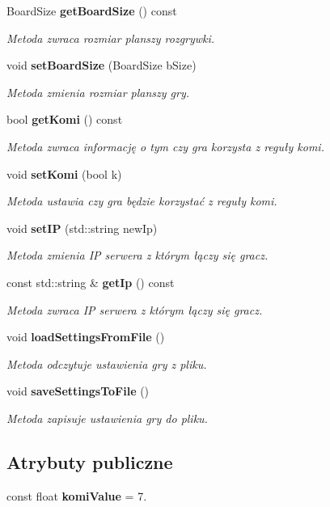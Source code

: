 \begin{DoxyCompactItemize}
Board\+Size \textbf{ get\+Board\+Size} () const
\begin{DoxyCompactList}\small\item\em Metoda zwraca rozmiar planszy rozgrywki. \end{DoxyCompactList}\item 
void \textbf{ set\+Board\+Size} (Board\+Size b\+Size)
\begin{DoxyCompactList}\small\item\em Metoda zmienia rozmiar planszy gry. \end{DoxyCompactList}\item 
bool \textbf{ get\+Komi} () const
\begin{DoxyCompactList}\small\item\em Metoda zwraca informację o tym czy gra korzysta z reguły komi. \end{DoxyCompactList}\item 
void \textbf{ set\+Komi} (bool k)
\begin{DoxyCompactList}\small\item\em Metoda ustawia czy gra będzie korzystać z reguły komi. \end{DoxyCompactList}\item 
void \textbf{ set\+IP} (std\+::string new\+Ip)
\begin{DoxyCompactList}\small\item\em Metoda zmienia IP serwera z którym łączy się gracz. \end{DoxyCompactList}\item 
const std\+::string \& \textbf{ get\+Ip} () const
\begin{DoxyCompactList}\small\item\em Metoda zwraca IP serwera z którym łączy się gracz. \end{DoxyCompactList}\item 
void \textbf{ load\+Settings\+From\+File} ()
\begin{DoxyCompactList}\small\item\em Metoda odczytuje ustawienia gry z pliku. \end{DoxyCompactList}\item 
void \textbf{ save\+Settings\+To\+File} ()
\begin{DoxyCompactList}\small\item\em Metoda zapisuje ustawienia gry do pliku. \end{DoxyCompactList}\end{DoxyCompactItemize}
\subsection*{Atrybuty publiczne}
\begin{DoxyCompactItemize}
\item 
const float \textbf{ komi\+Value} = 7.
\end{DoxyCompactItemize}
